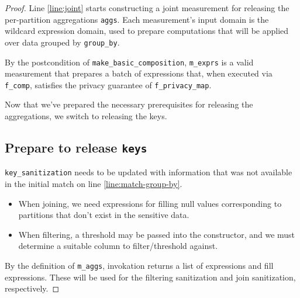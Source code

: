 \documentclass{article}
\begin{document}
\begin{proof}
Line \ref{line:joint} starts constructing a joint measurement 
for releasing the per-partition aggregations \texttt{aggs}.
Each measurement's input domain is the wildcard expression domain,
used to prepare computations that will be applied over data grouped by \texttt{group\_by}.

By the postcondition of \texttt{make\_basic\_composition}, 
\texttt{m\_exprs} is a valid measurement that prepares a batch of expressions that, 
when executed via \texttt{f\_comp}, satisfies the privacy guarantee of \texttt{f\_privacy\_map}.

Now that we've prepared the necessary prerequisites for releasing the aggregations,
we switch to releasing the keys.

\subsection{Prepare to release \texttt{keys}}
\texttt{key\_sanitization} needs to be updated with information that was not available in the initial match on line \ref{line:match-group-by}.
\begin{itemize}
    \item When joining, we need expressions for filling null values corresponding to partitions that don't exist in the sensitive data.
    \item When filtering, a threshold may be passed into the constructor, and we must determine a suitable column to filter/threshold against.
\end{itemize}

By the definition of \texttt{m\_aggs}, invokation returns a list of expressions and fill expressions.
These will be used for the filtering sanitization and join sanitization, respectively.


\end{proof}
\end{document}
